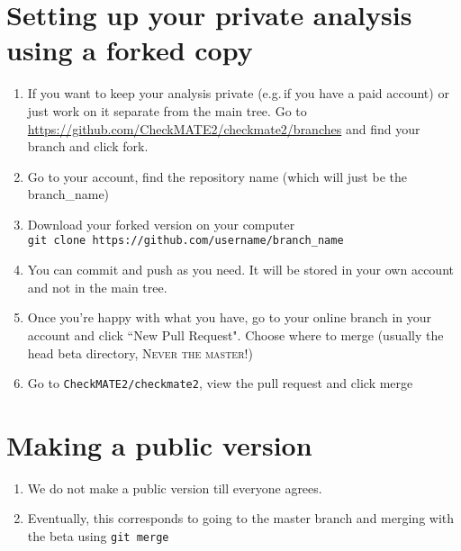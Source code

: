 \documentclass[12pt]{article}
\begin{document}
\section{Setting up your private analysis using a forked copy}
\begin{enumerate}
\item If you want to keep your analysis private (e.g.\,if you have a paid account) or just work on it separate from the main tree.
Go to \url{https://github.com/CheckMATE2/checkmate2/branches} and find your branch and click fork.
\item Go to your account, find the repository name (which will just be the branch\_name)
\item Download your forked version on your computer \\
\texttt{git clone https://github.com/username/branch\_name}
\item You can commit and push as you need.  It will be stored in your own account and not in the main tree.
\item Once you're happy with what you have, go to your online branch in your account and click ``New Pull Request".  Choose where to merge ({\color{red}usually the head beta directory, \textsc{Never the master!}})
\item Go to \texttt{CheckMATE2/checkmate2}, view the pull request and click merge
\end{enumerate}

\section{Making a public version}

\begin{enumerate}
\item We do not make a public version till everyone agrees.
\item Eventually, this corresponds to going to the master branch and merging with the beta using \texttt{git merge} 
\end{enumerate}
\end{document}
